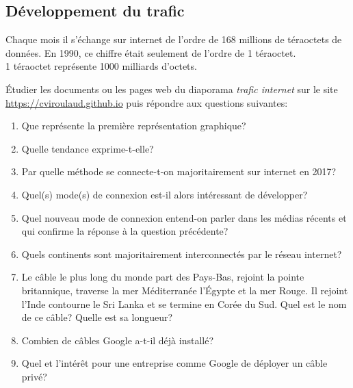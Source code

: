 \documentclass[a4paper,11pt]{article}
\begin{document}
\begin{Form}
\subsection{Développement du trafic}
Chaque mois il s'échange sur internet de l'ordre de 168 millions de téraoctets de données. En 1990, ce chiffre était seulement de l'ordre de 1 téraoctet.\\1 téraoctet représente 1000 milliards d'octets.
\begin{activite}
Étudier les documents ou les pages web du diaporama \emph{trafic internet} sur le site \url{https://cviroulaud.github.io} puis répondre aux questions suivantes:
\begin{enumerate}
\item Que représente la première représentation graphique?
\item Quelle tendance exprime-t-elle?
\item Par quelle méthode se connecte-t-on majoritairement sur internet en 2017?
\item Quel(s) mode(s) de connexion est-il alors intéressant de développer?
\item Quel nouveau mode de connexion entend-on parler dans les médias récents et qui confirme la réponse à la question précédente?
\item Quels continents sont majoritairement interconnectés par le réseau internet?
\item Le câble le plus long du monde part des Pays-Bas, rejoint la pointe britannique, traverse la mer Méditerranée l'Égypte et la mer Rouge. Il rejoint l'Inde contourne le Sri Lanka et se termine en Corée du Sud. Quel est le nom de ce câble? Quelle est sa longueur?
\item Combien de câbles Google a-t-il déjà installé?
\item Quel et l'intérêt pour une entreprise comme Google de déployer un câble privé?
\end{enumerate}
\end{activite}

\end{Form}
\end{document}
